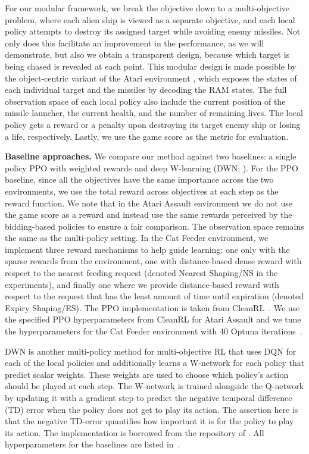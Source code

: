 For our modular framework, we break the objective down to a multi-objective problem, where each alien ship is viewed as a separate objective, and each local policy attempts to destroy its assigned target while avoiding enemy missiles. 
Not only does this facilitate an improvement in the performance, as we will demonstrate, but also we obtain a transparent design, because which target is being chased is revealed at each point. 
This modular design is made possible by the object-centric variant of the Atari environment \citep{delfosse2023ocatari}, which exposes the states of each individual target and the missiles by decoding the RAM states. 
The full observation space of each local policy also include the current position of the missile launcher, the current health, and the number of remaining lives. 
The local policy gets a reward or a penalty upon destroying its target enemy ship or losing a life, respectively. 
Lastly, we use the game score as the metric for evaluation.


\textbf{Baseline approaches.}
We compare our method against two baselines: a single policy PPO with weighted rewards and deep W-learning (DWN; \citet{rosero2024multi}). 
For the PPO baseline, since all the objectives have the same importance across the two environments, we use the total reward across objectives at each step as the reward function.
We note that in the Atari Assault environment we do not use the game score as a reward and instead use the same rewards perceived by the bidding-based policies to ensure a fair comparison.
The observation space remains the same as the multi-policy setting. 
In the Cat Feeder environment, we implement three reward mechanisms to help guide learning: one only with the sparse rewards from the environment, one with distance-based dense reward with respect to the nearest feeding request (denoted Nearest Shaping/NS in the experiments), and finally one where we provide distance-based reward with respect to the request that has the least amount of time until expiration (denoted Expiry Shaping/ES).
The PPO implementation is taken from CleanRL~\citep{huang2022cleanrl}.
We use the specified PPO hyperparameters from CleanRL for Atari Assault and we tune the hyperparameters for the Cat Feeder environment with 40 Optuna iterations~\citep{akiba2019optuna}.

DWN is another multi-policy method for multi-objective RL that uses DQN for each of the local policies and additionally learns a W-network for each policy that predict scalar weights. 
These weights are used to choose which policy's action should be played at each step. 
The W-network is trained alongside the Q-network by updating it with a gradient step to predict the negative temporal difference (TD) error when the policy does not get to play its action.
The assertion here is that the negative TD-error quantifies how important it is for the policy to play its action. 
The implementation is borrowed from the repository of \citet{rosero2024multi}. All hyperparameters for the baselines are listed in~.